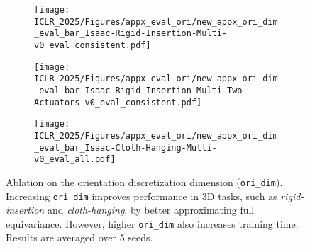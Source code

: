 \begin{figure*}[h]
    \makebox[\textwidth][c]{
    
    }
    \centering
    \begin{subfigure}[b]{0.32\linewidth}
        \texttt{[image: ICLR\_2025/Figures/appx\_eval\_ori/new\_appx\_ori\_dim\_eval\_bar\_Isaac-Rigid-Insertion-Multi-v0\_eval\_consistent.pdf]}
    \end{subfigure}
    \hfill
    \begin{subfigure}[b]{0.32\linewidth}
        \texttt{[image: ICLR\_2025/Figures/appx\_eval\_ori/new\_appx\_ori\_dim\_eval\_bar\_Isaac-Rigid-Insertion-Multi-Two-Actuators-v0\_eval\_consistent.pdf]}
    \end{subfigure}
    \hfill
    \begin{subfigure}[b]{0.32\linewidth}
        \texttt{[image: ICLR\_2025/Figures/appx\_eval\_ori/new\_appx\_ori\_dim\_eval\_bar\_Isaac-Cloth-Hanging-Multi-v0\_eval\_all.pdf]}
    \end{subfigure}
    \caption{Ablation on the orientation discretization dimension (\texttt{ori\_dim}). Increasing \texttt{ori\_dim} improves performance in 3D tasks, such as \textit{rigid-insertion} and \textit{cloth-hanging}, by better approximating full equivariance. However, higher \texttt{ori\_dim} also increases training time. Results are averaged over 5 seeds.}
    \vspace{-0.2cm}
    \label{fig:appx_ori_dim}
\end{figure*}
